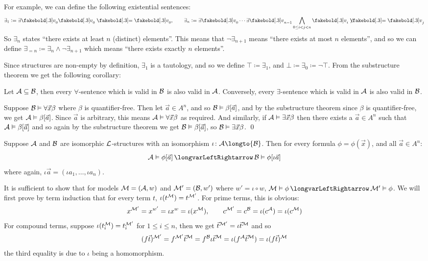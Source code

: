 \edefn

For example, we can define the following existential sentences:
$$ \exists_1 \coloneqq \exists\v_0\v_0\eq\v_0,\qquad \exists_n\coloneqq \exists\v_0\cdots\exists\v_{n-1}\bigwedge_{0\leq i<j<n}\v_i\neqb\v_j $$
So $\exists_n$ states ``there exists at least $n$ (distinct) elements''.
This means that $\neg\exists_{n+1}$ means ``there exists at most $n$ elements'', and so we can define $\exists_{=n}\coloneqq\exists_n\land\neg\exists_{n+1}$ which means ``there exists exactly $n$
elements''.

Since structures are non-empty by definition, $\exists_1$ is a tautology, and so we define $\top\coloneqq\exists_1$, and $\bot\coloneqq\exists_0\coloneqq\neg\top$.
From the substructure theorem we get the following corollary:

\bcoro

    Let ${\cal A}\subseteq{\cal B}$, then every $\forall$-sentence which is valid in ${\cal B}$ is also valid in ${\cal A}$.
    Conversely, every $\exists$-sentence which is valid in ${\cal A}$ is also valid in ${\cal B}$.

\ecoro

Suppose ${\cal B}\vDash\forall\vec x\beta$ where $\beta$ is quantifier-free.
Then let $\vec a\in A^n$, and so ${\cal B}\vDash\beta[\vec a]$, and by the substructure theorem since $\beta$ is quantifier-free, we get ${\cal A}\vDash\beta[\vec a]$.
Since $\vec a$ is arbitrary, this means ${\cal A}\vDash\forall\vec x\beta$ as required.
And similarly, if ${\cal A}\vDash\exists\vec x\beta$ then there exists a $\vec a\in A^n$ such that ${\cal A}\vDash\beta[\vec a]$ and so again by the substructure theorem we get ${\cal B}\vDash\beta[\vec a]$,
so ${\cal B}\vDash\exists\vec x\beta$.
\qed

\bthrm[title=The Invariance Theorem, name=invariancetheorem]

    Suppose ${\cal A}$ and ${\cal B}$ are isomorphic $\cal L$-structures with an isomorphism $\iota\colon{\cal A}\longto{\cal B}$.
    Then for every formula $\phi=\phi(\vec x)$, and all $\vec a\in A^n$:
    $$ {\cal A}\vDash\phi[\vec a] \iff {\cal B}\vDash\phi[\iota\vec a] $$
    where again, $\iota\vec a=(\iota a_1,\dots,\iota a_n)$.

\ethrm

It is sufficient to show that for models ${\cal M}=({\cal A},w)$ and ${\cal M'}=({\cal B},w')$ where $w'=\iota\circ w$, ${\cal M}\vDash\phi\iff{\cal M}'\vDash\phi$.
We will first prove by term induction that for every term $t$, $\iota(t^{\cal M})=t^{\cal M'}$.
For prime terms, this is obvious:
$$ x^{\cal M'} = x^{w'} = \iota x^w = \iota(x^{\cal M}),\qquad c^{\cal M'} = c^{\cal B} = \iota(c^{\cal A}) = \iota(c^{\cal M}) $$
For compound terms, suppose $\iota(t_i^{\cal M})=t_i^{\cal M'}$ for $1\leq i\leq n$, then we get $\vec t^{\cal M'}=\iota\vec t^{\cal M}$ and so
$$ (f\vec t)^{\cal M'} = f^{\cal M'}\vec t^{\cal M} = f^{\cal B}\iota\vec t^{\cal M} = \iota(f^{\cal A}\vec t^{\cal M}) = \iota(f\vec t)^{\cal M} $$
the third equality is due to $\iota$ being a homomorphism.

